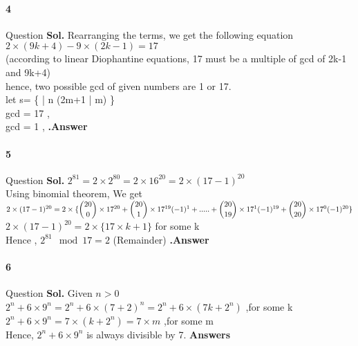 \documentclass[12pt]{amsart}
\begin{document}

\paragraph*{4} Question
\bigskip
\textbf{Sol.} Rearranging the terms, we get the following equation\\
$2\times(9k + 4)-9\times(2k- 1)= 17$\\ 
(according to linear Diophantine equations, 17 must be a multiple of gcd of 2k-1 and 9k+4)\\
hence, two possible gcd of given numbers are 1 or 17.\\
let s= \{  |  n \in (2m+1 | m\in {})  \} \\
gcd = 17 , \\
gcd = 1 , \not {} \textbf{.Answer}


\paragraph*{5} Question
\bigskip
\textbf{Sol.} $
2^{81}=2\times2^{80}=2\times16^{20}=2\times(17-1)^{20}
$
\\Using binomial theorem, We get\\
$
2\times(17-1)^{20}=2\times\{
\dbinom{20}{0}\times17^{20} + \dbinom{20}{1}\times17^{19} (-1)^{1} + ..... +
\dbinom{20}{19}\times17^{1} (-1)^{19} +
\dbinom{20}{20}\times17^{0} (-1)^{20}
\}
$\\
\implies $
2\times(17-1)^{20}=2\times\{
17\times k + 1
\}
$
for some k \in {}\\
Hence ,
$2^{81} \mod 17= 2$ (Remainder) \textbf{.Answer}

\paragraph*{6} Question
\bigskip
\textbf{Sol.} Given $n>0$ \\
$
2^{n} + 6\times9^{n}=2^{n} + 6\times(7+ 2)^{n}=2^{n} + 6\times(7k+ 2^{n})
$  ,for some k \in {}\\
\implies$ 2^{n} + 6\times9^{n} =7\times(k+ 2^{n})=7\times m 
$ ,for some m \in {}\\
Hence, $2^{n} + 6\times9^{n}$ is always divisible by 7. \textbf{Answers}\\
\end{document}
